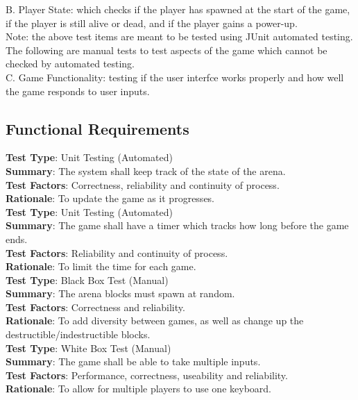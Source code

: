 \documentclass[12pt, letterpaper]{article}
\begin{document}
	\noindent B. \indent Player State: which checks if the player has spawned at the start of the game, if the player is still alive or dead, and if the player gains a power-up.\\
	
	\noindent Note: the above test items are meant to be tested using JUnit automated testing. The following are manual tests to test aspects of the game which cannot be checked by automated testing.\\ 
	
	\noindent C. \indent Game Functionality: testing if the user interfce works properly and how well the game responds to user inputs.
	
	\subsection{Functional Requirements}

	\noindent \textbf{Test Type}: Unit Testing (Automated)\\
	\noindent \textbf{Summary}: The system shall keep track of the state of the arena.\\
	\noindent \textbf{Test Factors}: Correctness, reliability and continuity of process.\\
	\noindent \textbf{Rationale}: To update the game as it progresses.\\

	\noindent \textbf{Test Type}: Unit Testing (Automated)\\
	\noindent \textbf{Summary}: The game shall have a timer which tracks how long before the game ends.\\
	\noindent \textbf{Test Factors}: Reliability and continuity of process. \\
	\noindent \textbf{Rationale}: To limit the time for each game.\\

	\noindent \textbf{Test Type}: Black Box Test (Manual)\\
	\noindent \textbf{Summary}: The arena blocks must spawn at random.\\
	\noindent \textbf{Test Factors}: Correctness and reliability.\\
	\noindent \textbf{Rationale}: To add diversity between games, as well as change up the destructible/indestructible blocks.\\

	\noindent \textbf{Test Type}: White Box Test (Manual)\\
	\noindent \textbf{Summary}: The game shall be able to take multiple inputs.\\
	\noindent \textbf{Test Factors}: Performance, correctness, useability and reliability.\\
	\noindent \textbf{Rationale}: To allow for multiple players to use one keyboard.\\
	
\end{document}
